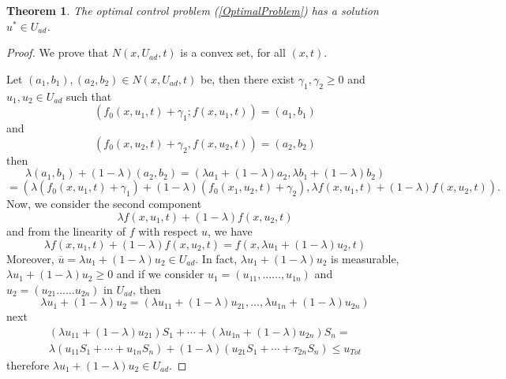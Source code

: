 \documentclass[a4paper,10pt]{article}
\newtheorem{thm}{Theorem}[section]
\theoremstyle{remark}
\begin{document}
\begin{thm}
The optimal control problem (\ref{OptimalProblem}) has a solution $ u^{*} \in U_{ad}$.
\end{thm}
\begin{proof}
We prove that $N(x, U_{a d}, t)$ is a convex set, for all $(x,t)$. 

Let 
$\left(a_{1}, b_{1}\right), \left(a_{2}, b_{2}\right) \in N\left(x, U_{a d}, t\right)$ be, then there exist $\gamma_{1}, \gamma_{2} \geq 0$ and $ u_{1},  u_2 \in  U_{a d}$ such that 
$$
\left(f_{0}\left(x,  u_{1}, t\right)+\gamma_{1} ; f\left(x,  u_{1}, t\right)\right)=\left(a_{1}, b_{1}\right) 
$$
and
$$
\left(f_{0}\left(x,  u_{2}, t\right)+\gamma_{2}, f\left(x,  u_{2}, t\right)\right)=\left(a_{2}, b_{2}\right)
$$
then 
$$
\lambda\left(a_{1}, b_{1}\right)+(1-\lambda)\left(a_{2}, b_{2}\right)=\left(\lambda a_1+(1-\lambda) a_{2}, \lambda b_{1}+(1-\lambda) b_{2}\right)
$$
$$
=\left(\lambda\left(f_{0}\left(x,  u_{1}, t\right)+\gamma_{1}\right)+(1-\lambda)\left(f_{0}\left(x_{1},  u_{2}, t\right)+\gamma_{2}\right), \lambda f\left(x,  u_{1}, t\right)+(1-\lambda) f\left(x, u_{2}, t\right)\right).
$$
Now, we consider the second component
$$
\lambda f\left(x,  u_{1}, t\right)+(1-\lambda) f\left(x,  u_{2}, t\right)
$$
and from the linearity of $f$ with respect $ u$, we have 
\[\lambda f\left(x,  u_{1}, t\right)+(1-\lambda) f\left(x,  u_{2}, t\right)=f\left(x, \lambda  u_{1}+(1-\lambda)  u_{2}, t\right)\]
Moreover, $\overline{ u}=\lambda  u_{1}+(1-\lambda)  u_{2} \in U_{ad}$. In fact, $\lambda  u_{1}+(1-\lambda)  u_{2}$ is measurable, $\lambda  u_{1}+(1-\lambda)  u_{2} \geqslant 0$ and if we consider
$ u_{1}=\left( u_{11}, \ldots \ldots,  u_{1 n}\right)$ and $  u_{2}=\left( u_{21} \ldots \ldots  u_{2 n}\right)$ in $U_{ad}$, then
\[
\lambda  u_{1}+(1-\lambda)  u_{2}=\left(\lambda  u_{11}+(1-\lambda)  u_{21}, \ldots,\lambda  u_{1 n}+(1-\lambda)  u_{2 n}\right)
\]
next
$$
\begin{array}{l}
\left(\lambda  u_{11}+(1-\lambda)  u_{21}\right)S_{1}+\cdots+\left(\lambda  u_{1n}+(1-\lambda)  u_{2n}\right)S_{n}=\\
\lambda\left( u_{11}S_{1}+\cdots+ u_{1 n}S_{n}\right)+(1-\lambda)\left( u_{21}S_{1}+\cdots+\tau_{2 n}S_{n}\right)\leq { u}_{Tot}
\end{array}
$$
therefore $\lambda  u_{1}+(1-\lambda)  u_{2}\in U_{ad}$.


\end{proof}
\end{document}
